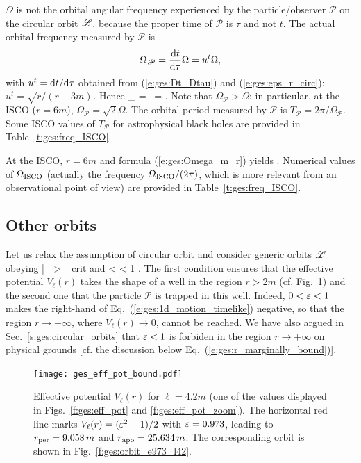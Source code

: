 \begin{remark}
$\Omega$ is not the orbital angular frequency experienced by the particle/observer
$\mathscr{P}$ on the circular orbit $\mathscr{L}$, because the proper time of $\mathscr{P}$ is
$\tau$ and not $t$. The actual orbital frequency measured by $\mathscr{P}$
is
\[
    \Omega_{\mathscr{P}} = \frac{\mathrm{d} t}{\mathrm{d} \tau} \Omega = u^t \Omega ,
\]
with $u^t = \mathrm{d} t/\mathrm{d}\tau$ obtained from (\ref{e:ges:Dt_Dtau}) and
(\ref{e:ges:eps_r_circ}): $u^t = \sqrt{r/(r-3m)}$. Hence
\be
    \Omega_{} = \, \Omega  =
        .
\ee
Note that $\Omega_{\mathscr{P}} > \Omega$; in particular, at the ISCO ($r=6m$),
$\Omega_{\mathscr{P}} = \sqrt{2} \Omega$. The orbital period measured by $\mathscr{P}$
is $T_{\mathscr{P}} = 2\pi/\Omega_{\mathscr{P}}$. Some ISCO values of $T_{\mathscr{P}}$
for astrophysical black holes are provided in Table~\ref{t:ges:freq_ISCO}.
\end{remark}


At the ISCO, $r=6m$ and formula (\ref{e:ges:Omega_m_r}) yields
\be
     .
\ee
Numerical values of $\Omega_{\rm ISCO}$ (actually the frequency $\Omega_{\rm ISCO}/(2\pi)$,
which is more relevant from an observational point of view) are provided in
Table~\ref{t:ges:freq_ISCO}.

\subsection{Other orbits}

Let us relax the assumption of circular orbit and consider generic orbits $\mathscr{L}$
obeying
\be
    | \ell | > \ell_{\rm crit} \qquad\mbox{and} < \veps < 1 .
\ee
The first condition ensures that the effective potential $V_{\ell}(r)$
takes the shape of a well in the region $r>2m$ (cf. Fig.~\ref{f:ges:eff_pot_bound})
and the second one that the particle $\mathscr{P}$ is trapped in this well.
Indeed, $0 < \varepsilon < 1$  makes the right-hand of Eq.~(\ref{e:ges:1d_motion_timelike}) negative, so
that the region $r\to +\infty$, where $V_{\ell}(r)\to 0$,
cannot be reached. We have also argued in Sec.~\ref{s:ges:circular_orbits}
that $\varepsilon < 1$ is forbiden in the region $r\to +\infty$ on physical
grounds [cf. the discussion below Eq.~(\ref{e:ges:r_marginally_bound})].

\begin{figure}
\centerline{\texttt{[image: ges\_eff\_pot\_bound.pdf]}}
\caption[]{\label{f:ges:eff_pot_bound} \footnotesize
Effective potential $V_{\ell}(r)$ for $\ell = 4.2 m$ (one of the values displayed
in Figs.~\ref{f:ges:eff_pot}  and \ref{f:ges:eff_pot_zoom}).
The horizontal red line marks $V_{\ell}(r) = (\varepsilon^2-1)/2$
with $\varepsilon = 0.973$, leading to $r_{\rm per} = 9.058\, m$ and $r_{\rm apo} = 25.634\, m$.
The corresponding orbit is shown in Fig.~\ref{f:ges:orbit_e973_l42}.
}
\end{figure}

